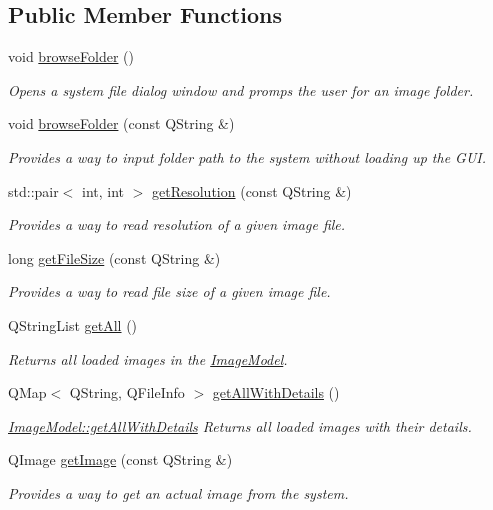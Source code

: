 \subsection*{Public Member Functions}
\begin{DoxyCompactItemize}
\item 
\mbox{\label{classImageModel_a556093e64b3d118525120e465a7dedf6}} 
void \hyperlink{classImageModel_a556093e64b3d118525120e465a7dedf6}{browse\+Folder} ()
\begin{DoxyCompactList}\small\item\em Opens a system file dialog window and promps the user for an image folder. \end{DoxyCompactList}\item 
void \hyperlink{classImageModel_a4923192da890831266d2348ce54b2e45}{browse\+Folder} (const Q\+String \&)
\begin{DoxyCompactList}\small\item\em Provides a way to input folder path to the system without loading up the G\+UI. \end{DoxyCompactList}\item 
std\+::pair$<$ int, int $>$ \hyperlink{classImageModel_af44b02e6974b36d2ede3b1b3f78ebc84}{get\+Resolution} (const Q\+String \&)
\begin{DoxyCompactList}\small\item\em Provides a way to read resolution of a given image file. \end{DoxyCompactList}\item 
long \hyperlink{classImageModel_a38c8d5868b7a8f8acca235c4383c5102}{get\+File\+Size} (const Q\+String \&)
\begin{DoxyCompactList}\small\item\em Provides a way to read file size of a given image file. \end{DoxyCompactList}\item 
Q\+String\+List \hyperlink{classImageModel_a498623ffa9423fd249c62467c01edeee}{get\+All} ()
\begin{DoxyCompactList}\small\item\em Returns all loaded images in the \hyperlink{classImageModel}{Image\+Model}. \end{DoxyCompactList}\item 
Q\+Map$<$ Q\+String, Q\+File\+Info $>$ \hyperlink{classImageModel_a8256d5e2baa8833788bb63043e936137}{get\+All\+With\+Details} ()
\begin{DoxyCompactList}\small\item\em \hyperlink{classImageModel_a8256d5e2baa8833788bb63043e936137}{Image\+Model\+::get\+All\+With\+Details} Returns all loaded images with their details. \end{DoxyCompactList}\item 
Q\+Image \hyperlink{classImageModel_ac0021794e5694bd76c76349b8af96428}{get\+Image} (const Q\+String \&)
\begin{DoxyCompactList}\small\item\em Provides a way to get an actual image from the system. \end{DoxyCompactList}\end{DoxyCompactItemize}
